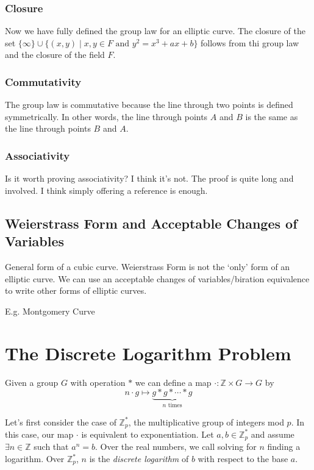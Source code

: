 \documentclass{article}
\begin{document}
\subsubsection{Closure}
Now we have fully defined the group law for an elliptic curve.
The closure of the set $\{\infty\} \cup \{(x,y) \mid x,y \in F \text{ and } y^2 = x^3 + ax + b\}$ follows from thi group law and the closure of the field $F$.

\subsubsection{Commutativity}
The group law is commutative because the line through two points is defined symmetrically.
In other words, the line through points $A$ and $B$ is the same as the line through points $B$ and $A$.

\subsubsection{Associativity}
Is it worth proving associativity? I think it's not.
The proof is quite long and involved.
I think simply offering a reference is enough.

\subsection{Weierstrass Form and Acceptable Changes of Variables}
General form of a cubic curve.
Weierstrass Form is not the `only' form of an elliptic curve. 
We can use an acceptable changes of variables/biration equivalence to write other forms of elliptic curves.

E.g. Montgomery Curve

\clearpage

\section{The Discrete Logarithm Problem}
Given a group $G$ with operation $*$ we can define a map $\cdot: \mathbb{Z} \times G \to G$ by
$$n\cdot g \mapsto \underbrace{g * g * \cdots * g}_{n\text{ times}}$$

Let's first consider the case of $\mathbb{Z}_p^*$, the multiplicative group of integers mod $p$.
In this case, our map $\cdot$ is equivalent to exponentiation.
Let $a,b \in \mathbb{Z}_p^*$ and assume $\exists n \in \mathbb{Z}$ such that $a^n = b$.
Over the real numbers, we call solving for $n$ finding a logarithm. Over $\mathbb{Z}_p^*$, $n$ is the \textit{discrete logarithm} of $b$ with respect to the base $a$.
\end{document}
